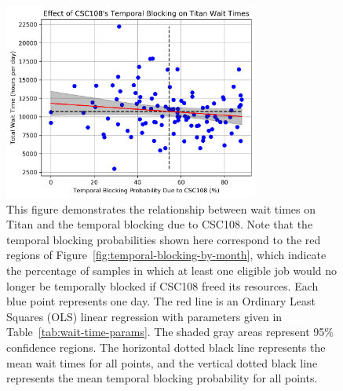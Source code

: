 \begin{figure}
  \includegraphics[width=0.75\textwidth]{images/linfit-wait-time-vs-csc108-temporal.png}
\caption{This figure demonstrates the relationship between wait times on Titan
and the temporal blocking due to CSC108. Note that the temporal blocking
probabilities shown here correspond to the red regions of
Figure~\ref{fig:temporal-blocking-by-month}, which indicate the percentage of
samples in which at least one eligible job would no longer be temporally
blocked  if CSC108 freed its resources. Each blue point represents one day. The
red line is an Ordinary Least Squares (OLS) linear regression with parameters
given in Table~\ref{tab:wait-time-params}. The shaded gray areas represent 95\%
confidence regions. The horizontal dotted black line represents the mean wait
times for all points, and the vertical dotted black line represents the mean
temporal blocking probability for all points.}
\label{fig:wait-time-temporal-csc108}
\end{figure}







%
%
%
%

